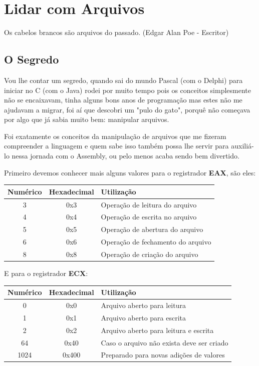 \chapter{Lidar com Arquivos}

\begin{remark}
	Os cabelos brancos são arquivos do passado. (Edgar Alan Poe - Escritor) 
\end{remark}

\section{O Segredo}
Vou lhe contar um segredo, quando sai do mundo Pascal (com o Delphi) para iniciar no C (com o Java) rodei por muito tempo pois os conceitos simplesmente não se encaixavam, tinha alguns bons anos de programação mas estes não me ajudavam a migrar, foi aí que descobri um "pulo do gato", porquê não começava por algo que já sabia muito bem: manipular arquivos.

Foi exatamente os conceitos da manipulação de arquivos que me fizeram compreender a linguagem e quem sabe isso também possa lhe servir para auxiliá-lo nessa jornada com o Assembly, ou pelo menos acaba sendo bem divertido.

Primeiro devemos conhecer mais alguns valores para o registrador \textbf{EAX}, são eles:
\begin{table}[H]
	\centering 
	\begin{tabular}{c | c | l }
		\textbf{Numérico} & \textbf{Hexadecimal} & \textbf{Utilização} \\ \hline 
		3 & 0x3 & Operação de leitura do arquivo \\
		4 & 0x4 & Operação de escrita no arquivo \\
		5 & 0x5 & Operação de abertura do arquivo \\
		6 & 0x6 & Operação de fechamento do arquivo \\
		8 & 0x8 & Operação de criação do arquivo
	\end{tabular}
\end{table}

E para o registrador \textbf{ECX}:
\begin{table}[H]
	\centering 
	\begin{tabular}{c | c | l }
		\textbf{Numérico} & \textbf{Hexadecimal} & \textbf{Utilização} \\ \hline 
		0 & 0x0 & Arquivo aberto para leitura \\
		1 & 0x1 & Arquivo aberto para escrita \\
		2 & 0x2 & Arquivo aberto para leitura e escrita \\
		64 & 0x40 & Caso o arquivo não exista deve ser criado \\
		1024 & 0x400 & Preparado para novas adições de valores
	\end{tabular}
\end{table}

